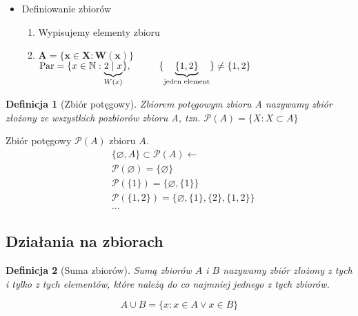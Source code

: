 \documentclass[a5paper,8pt]{article}
\theoremstyle{mythmstyle}
\newtheorem{definition}{Definicja}[section]
\newcommand\tab[1][1cm]{\hspace*{#1}}
\begin{document}
\begin{itemize}
            \item Definiowanie zbiorów
                \begin{enumerate}
                    \item Wypisujemy elementy zbioru
                    \item $ \mathbf{A = \{ x \in X : W(x) \} } $ \\
                    $ \text{Par} = \{x \in \mathbb{N} : \underbrace{2 \mid x}_{W(x)} \}, \tab \{ \underbrace{ \{1, 2\} }_{\text{jeden element}}\} \neq \{1, 2\} $
                \end{enumerate}

        \end{itemize}

        \begin{definition}[Zbiór potęgowy]
            Zbiorem potęgowym zbioru A nazywamy zbiór złożony ze wszystkich pozbiorów zbioru A, tzn. $ \mathcal{P}(A) = \{X : X \subset A \} $
        \end{definition}

        Zbiór potęgowy $ \mathcal{P}(A) $ zbioru $ A $.
        \begin{align*}
            & \{ \varnothing, A \} \subset \mathcal{P}(A) \longleftarrow \\
            & \mathcal{P}(\varnothing) = \{\varnothing\} \\
            & \mathcal{P}(\{1\}) = \{\varnothing, \{1\}\} \\
            & \mathcal{P}(\{1, 2\}) = \{\varnothing, \{1\}, \{2\}, \{1, 2\} \} \\
            & \ldots
        \end{align*}

        \subsection{Działania na zbiorach} %
        \label{sub:dzialania_na_zbiorach}

        \begin{definition}[Suma zbiorów]
            Sumą zbiorów $A$ i $B$ nazywamy zbiór złożony z tych i tylko z tych elementów, które należą do co najmniej jednego z tych zbiorów.

            \begin{equation*}
                A \cup B = \{ x : x \in A \vee x \in B \}
            \end{equation*}

        \end{definition}
\end{document}
